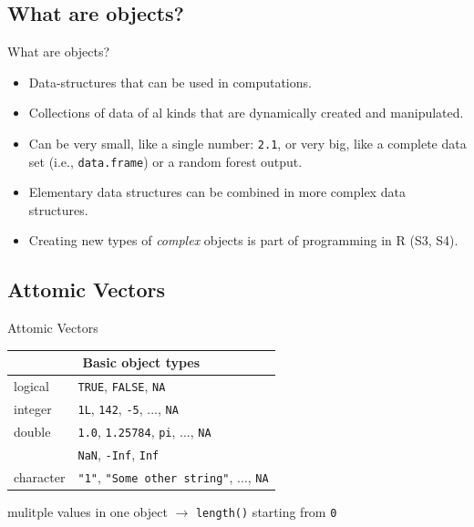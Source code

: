 \documentclass{beamer}\usepackage[]{graphicx}\usepackage[]{color}
\begin{document}
\subsection{What are objects?}


\begin{frame}{What are objects?}

	\begin{itemize}
			\item Data-structures that can be used in computations.
			\item Collections of data of al kinds that are dynamically created and manipulated.
			\item Can be very small, like a single number: \texttt{2.1}, or very big, like a complete data set  (i.e., \texttt{data.frame}) or a random forest output.
			\item Elementary data structures can be combined in more complex data structures.
			\item Creating new types of \emph{complex} objects is part of programming in R (S3, S4).
			
	\end{itemize}
\end{frame}


\subsection{Attomic Vectors}


\begin{frame}{Attomic Vectors}

\begin{center}
  \begin{tabular}{| l | l |}
    \hline
    \multicolumn{2}{|c|}{Basic object types} \\ \hline
    logical   & \texttt{TRUE}, \texttt{FALSE}, \texttt{NA} \\ 
    integer   & \texttt{1L}, \texttt{142}, \texttt{-5}, ..., \texttt{NA} \\
    double    & \texttt{1.0}, \texttt{1.25784}, \texttt{pi}, ..., \texttt{NA} \\
              & \texttt{NaN}, \texttt{-Inf}, \texttt{Inf} \\
    character & \texttt{"1"}, \texttt{"Some other string"}, ..., \texttt{NA} \\
    \hline
  \end{tabular}
\end{center}

mulitple values in one object $\rightarrow$ \texttt{length()} starting from \texttt{0}

\end{frame}
\end{document}
